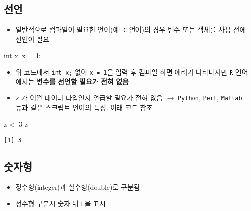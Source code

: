 \documentclass[
  11pt,
]{krantz}
\newenvironment{Shaded}{\begin{snugshade}}{\end{snugshade}}
\newcommand{\DataTypeTok}[1]{\textcolor[rgb]{0.27,0.27,0.27}{#1}}
\newcommand{\DecValTok}[1]{\textcolor[rgb]{0.06,0.06,0.06}{#1}}
\newcommand{\NormalTok}[1]{#1}
\newcommand{\StringTok}[1]{\textcolor[rgb]{0.5,0.5,0.5}{#1}}
\providecommand{\tightlist}{%
  \setlength{\itemsep}{0pt}\setlength{\parskip}{0pt}}
\begin{document}
\normalsize

\hypertarget{definition}{%
\subsection{선언}\label{definition}}

\begin{itemize}
\tightlist
\item
  일반적으로 컴파일이 필요한 언어(예: \texttt{C} 언어)의 경우 변수 또는 객체를 사용 전에 선언이 필요
\end{itemize}

\footnotesize

\begin{Shaded}
\begin{Highlighting}[]
\DataTypeTok{int}\NormalTok{ x; }
\NormalTok{x = }\DecValTok{1}\NormalTok{;}
\end{Highlighting}
\end{Shaded}

\normalsize

\begin{itemize}
\item
  위 코드에서 \texttt{int\ x;} 없이 \texttt{x\ =\ 1}을 입력 후 컴파일 하면 에러가 나타나지만 \texttt{R} 언어에서는 \textbf{변수를 선언할 필요가 전혀 없음}
\item
  \texttt{z} 가 어떤 데이터 타입인지 언급할 필요가 전혀 없음 \(\rightarrow\) \texttt{Python}, \texttt{Perl}, \texttt{Matlab} 등과 같은 스크립트 언어의 특징. 아래 코드 참조
\end{itemize}

\footnotesize

\begin{Shaded}
\begin{Highlighting}[]
\NormalTok{z <-}\StringTok{ }\DecValTok{3}
\NormalTok{z}
\end{Highlighting}
\end{Shaded}

\begin{verbatim}
[1] 3
\end{verbatim}

\normalsize

\hypertarget{numeric}{%
\subsection{숫자형}\label{numeric}}

\begin{itemize}
\tightlist
\item
  정수형(integer)과 실수형(double)로 구분됨
\item
  정수형 구분시 숫자 뒤 \texttt{L}을 표시
\end{itemize}
\end{document}
